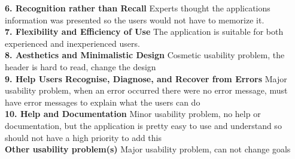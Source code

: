 \textbf{6. Recognition rather than Recall}
Experts thought the applications information was presented so the users would not have to memorize it. \\

\textbf{7. Flexibility and Efficiency of Use}
The application is suitable for both experienced and inexperienced users. \\

\textbf{8. Aesthetics and Minimalistic Design}
Cosmetic usability problem, the header is hard to read, change the design \\

\textbf{9. Help Users Recognise, Diagnose, and Recover from Errors} 
Major usability problem, when an error occurred there were no error message, must have error messages to explain what the users can do  \\

\textbf{10. Help and Documentation}
Minor usability problem, no help or documentation, but the application is pretty easy to use and understand so should not have a high priority to add this \\

\textbf{Other usability problem(s)} 
Major usability problem, can not change goals 


